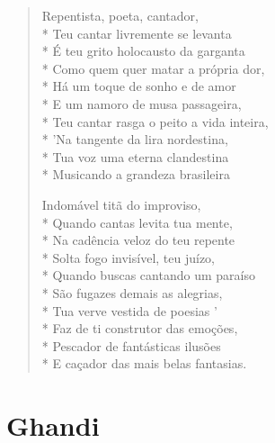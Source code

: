 \begin{verse}
Repentista, poeta, cantador,\\*
Teu cantar livremente se levanta\\*
É teu grito holocausto da garganta\\*
Como quem quer matar a própria dor,\\*
Há um toque de sonho e de amor\\*
E um namoro de musa passageira,\\*
Teu cantar rasga o peito a vida inteira,\\*
'Na tangente da lira nordestina,\\*
Tua voz uma eterna clandestina\\*
Musicando a grandeza brasileira

Indomável titã do improviso,\\*
Quando cantas levita tua mente,\\*
Na cadência veloz do teu repente\\*
Solta fogo invisível, teu juízo,\\*
Quando buscas cantando um paraíso\\*
São fugazes demais as alegrias,\\*
Tua verve vestida de poesias '\\*
Faz de ti construtor das emoções,\\*
Pescador de fantásticas ilusões\\*
E caçador das mais belas fantasias.
\end{verse}


\chapter{Ghandi}

